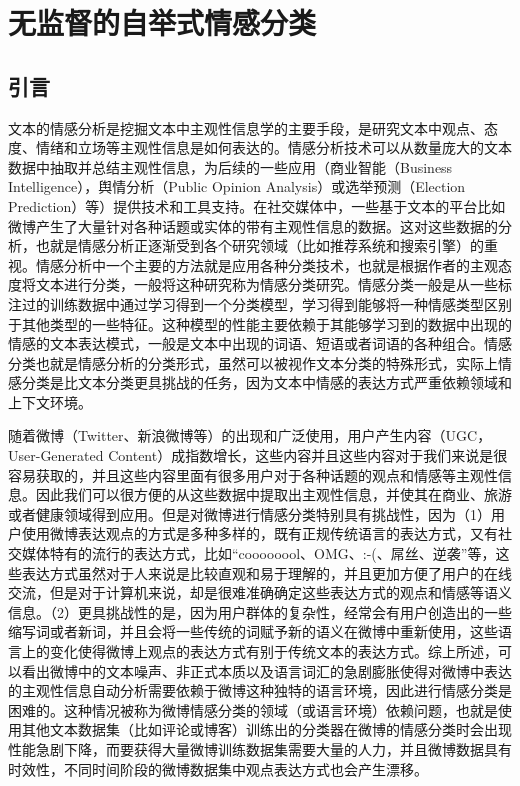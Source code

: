 \chapter{无监督的自举式情感分类}
\label{ch4}

\section{引言}
\label{ch4_intr}
文本的情感分析是挖掘文本中主观性信息学的主要手段，是研究文本中观点、态度、情绪和立场等主观性信息是如何表达的。情感分析技术可以从数量庞大的文本数据中抽取并总结主观性信息，为后续的一些应用（商业智能（Business Intelligence），舆情分析（Public Opinion Analysis）或选举预测（Election Prediction）等）提供技术和工具支持。在社交媒体中，一些基于文本的平台比如微博产生了大量针对各种话题或实体的带有主观性信息的数据。这对这些数据的分析，也就是情感分析正逐渐受到各个研究领域（比如推荐系统和搜索引擎）的重视。情感分析中一个主要的方法就是应用各种分类技术，也就是根据作者的主观态度将文本进行分类，一般将这种研究称为情感分类研究。情感分类一般是从一些标注过的训练数据中通过学习得到一个分类模型，学习得到能够将一种情感类型区别于其他类型的一些特征。这种模型的性能主要依赖于其能够学习到的数据中出现的情感的文本表达模式，一般是文本中出现的词语、短语或者词语的各种组合。情感分类也就是情感分析的分类形式，虽然可以被视作文本分类的特殊形式，实际上情感分类是比文本分类更具挑战的任务，因为文本中情感的表达方式严重依赖领域和上下文环境。

随着微博（Twitter、新浪微博等）的出现和广泛使用，用户产生内容（UGC，User-Generated Content）成指数增长，这些内容并且这些内容对于我们来说是很容易获取的，并且这些内容里面有很多用户对于各种话题的观点和情感等主观性信息。因此我们可以很方便的从这些数据中提取出主观性信息，并使其在商业、旅游或者健康领域得到应用。但是对微博进行情感分类特别具有挑战性，因为（1）用户使用微博表达观点的方式是多种多样的，既有正规传统语言的表达方式，又有社交媒体特有的流行的表达方式，比如“coooooool、OMG、:-(、屌丝、逆袭”等，这些表达方式虽然对于人来说是比较直观和易于理解的，并且更加方便了用户的在线交流，但是对于计算机来说，却是很难准确确定这些表达方式的观点和情感等语义信息。（2）更具挑战性的是，因为用户群体的复杂性，经常会有用户创造出的一些缩写词或者新词，并且会将一些传统的词赋予新的语义在微博中重新使用，这些语言上的变化使得微博上观点的表达方式有别于传统文本的表达方式。综上所述，可以看出微博中的文本噪声、非正式本质以及语言词汇的急剧膨胀使得对微博中表达的主观性信息自动分析需要依赖于微博这种独特的语言环境，因此进行情感分类是困难的。这种情况被称为微博情感分类的领域（或语言环境）依赖问题，也就是使用其他文本数据集（比如评论或博客）训练出的分类器在微博的情感分类时会出现性能急剧下降，而要获得大量微博训练数据集需要大量的人力，并且微博数据具有时效性，不同时间阶段的微博数据集中观点表达方式也会产生漂移。

